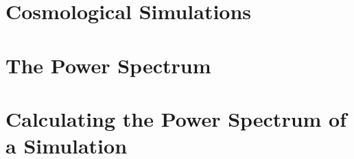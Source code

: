\Huge

\section{Cosmological Simulations}

\section{The Power Spectrum}

\section{Calculating the Power Spectrum of a Simulation}
